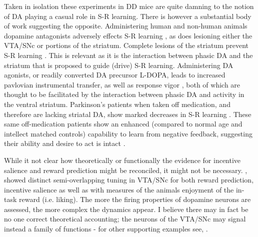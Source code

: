 \documentclass[doc,12pt]{apa}        %
\begin{document}
Taken in isolation these experiments in DD mice are quite damning to the notion of DA playing a casual role in S-R learning.  There is however a substantial body of work suggesting the opposite.  Administering human and non-human animals dopamine antagonists adversely effects S-R learning \cite{Pizzagalli:2010p7205}, as does lesioning either the VTA/SNc or portions of the striatum.  Complete lesions of the striatum prevent S-R learning \cite{Packard:2002p5074}.  This is relevant as it is the interaction between phasic DA and the striatum that is proposed to guide (drive) S-R learning. Administering DA agonists, or readily converted DA precursor L-DOPA, leads to increased pavlovian instrumental transfer, as well as response vigor \cite{Winterbauer:2007p6352}, both of which are thought to be facilitated by the interaction between phasic DA and activity in the ventral striatum.  Parkinson's patients when taken off medication, and therefore are lacking striatal DA, show marked decreases in S-R learning \cite{Pizzagalli:2010p7205}.  These same off-medication patients show an enhanced (compared to normal age and intellect matched controls) capability to learn from negative feedback, suggesting their ability and desire to act is intact \cite{Frank:2004p4709}.  

While it not clear how theoretically or functionally the evidence for incentive salience and reward prediction might be reconciled, it might not be necessary.  , showed distinct semi-overlapping tuning in VTA/SNc for both reward prediction, incentive salience as well as with measures of the animals enjoyment of the in-task reward (i.e. liking).  The more the firing properties of dopamine neurons are assessed, the more complex the dynamics appear.  I believe there may in fact be no one correct theoretical accounting; the neurons of the VTA/SNc may signal instead a family of functions - for other supporting examples see, .


\end{document}
